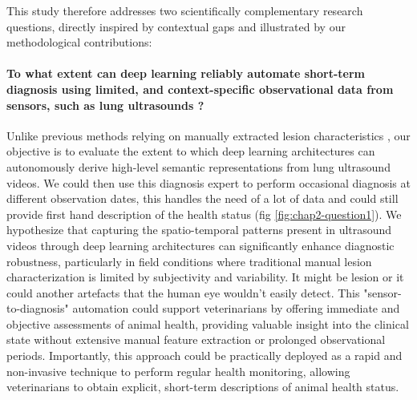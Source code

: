 
This study therefore addresses two scientifically complementary research questions, directly inspired by contextual gaps and illustrated by our methodological contributions:

\paragraph{To what extent can deep learning reliably automate short-term diagnosis using limited, and context-specific observational data from sensors, such as lung ultrasounds ?} Unlike previous methods relying on manually extracted lesion characteristics \cite{timsit_association_2019}, our objective is to evaluate the extent to which deep learning architectures can autonomously derive high-level semantic representations from lung ultrasound videos.  We could then use this diagnosis expert to perform occasional diagnosis at different observation dates, this handles the need of a lot of data and could still provide first hand description of the health status (fig \ref{fig:chap2-question1}). We hypothesize that capturing the spatio-temporal patterns present in ultrasound videos through deep learning architectures can significantly enhance diagnostic robustness, particularly in field conditions where traditional manual lesion characterization is limited by subjectivity and variability. It might be lesion or it could another artefacts that the human eye wouldn't easily detect. This "sensor-to-diagnosis" automation could support veterinarians by offering immediate and objective assessments of animal health, providing valuable insight into the clinical state without extensive manual feature extraction or prolonged observational periods. Importantly, this approach could be practically deployed as a rapid and non-invasive technique to perform regular health monitoring, allowing veterinarians to obtain explicit, short-term descriptions of animal health status.


